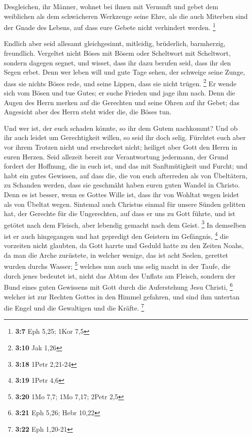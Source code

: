  Desgleichen, ihr Männer, wohnet bei ihnen mit Vernunft
und gebet dem weiblichen als dem schwächeren Werkzeuge seine Ehre, als
die auch Miterben sind der Gnade des Lebens, auf dass eure Gebete nicht
verhindert werden. \footnote{\textbf{3:7} Eph 5,25; 1Kor 7,5}

 Endlich aber seid allesamt gleichgesinnt, mitleidig,
brüderlich, barmherzig, freundlich.  Vergeltet nicht Böses
mit Bösem oder Scheltwort mit Scheltwort, sondern dagegen segnet, und
wisset, dass ihr dazu berufen seid, dass ihr den Segen erbet.
 Denn wer leben will und gute Tage sehen, der schweige
seine Zunge, dass sie nichts Böses rede, und seine Lippen, dass sie
nicht trügen. \footnote{\textbf{3:10} Jak 1,26}  Er wende
sich vom Bösen und tue Gutes; er suche Frieden und jage ihm nach.
 Denn die Augen des Herrn merken auf die Gerechten und
seine Ohren auf ihr Gebet; das Angesicht aber des Herrn steht wider die,
die Böses tun.

 Und wer ist, der euch schaden könnte, so ihr dem Gutem
nachkommt?  Und ob ihr auch leidet um Gerechtigkeit
willen, so seid ihr doch selig. Fürchtet euch aber vor ihrem Trotzen
nicht und erschrecket nicht;  heiliget aber Gott den
Herrn in euren Herzen. Seid allezeit bereit zur Verantwortung jedermann,
der Grund fordert der Hoffnung, die in euch ist,  und das
mit Sanftmütigkeit und Furcht; und habt ein gutes Gewissen, auf dass
die, die von euch afterreden als von Übeltätern, zu Schanden werden,
dass sie geschmäht haben euren guten Wandel in Christo. 
Denn es ist besser, wenn es Gottes Wille ist, dass ihr von Wohltat wegen
leidet als von Übeltat wegen.  Sintemal auch Christus
einmal für unsere Sünden gelitten hat, der Gerechte für die Ungerechten,
auf dass er uns zu Gott führte, und ist getötet nach dem Fleisch, aber
lebendig gemacht nach dem Geist. \footnote{\textbf{3:18} 1Petr 2,21-24}
 In demselben ist er auch hingegangen und hat gepredigt
den Geistern im Gefängnis, \footnote{\textbf{3:19} 1Petr 4,6}
 die vorzeiten nicht glaubten, da Gott harrte und Geduld
hatte zu den Zeiten Noahs, da man die Arche zurüstete, in welcher
wenige, das ist acht Seelen, gerettet wurden durchs Wasser; \footnote{\textbf{3:20}
  1Mo 7,7; 1Mo 7,17; 2Petr 2,5}  welches nun auch uns
selig macht in der Taufe, die durch jenes bedeutet ist, nicht das Abtun
des Unflats am Fleisch, sondern der Bund eines guten Gewissens mit Gott
durch die Auferstehung Jesu Christi, \footnote{\textbf{3:21} Eph 5,26;
  Hebr 10,22}  welcher ist zur Rechten Gottes in den
Himmel gefahren, und sind ihm untertan die Engel und die Gewaltigen und
die Kräfte. \footnote{\textbf{3:22} Eph 1,20-21}

